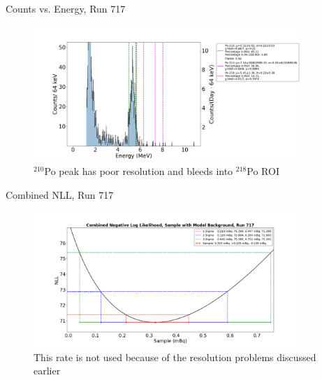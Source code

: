 \documentclass[aspectratio=169]{beamer}
\begin{document}
\begin{frame}{Counts vs. Energy, Run 717}
    \begin{figure}
        \begin{center}
            \includegraphics[width=0.9\textwidth]
            {assets/717/CvE.png}
            \caption{$^{210}$Po peak has poor resolution and bleeds into $^{218}$Po ROI}
        \end{center}
    \end{figure}
\end{frame}

\begin{frame}{Combined NLL, Run 717}
    \begin{figure}
        \begin{center}
            \includegraphics[width=0.9\textwidth]
            {assets/717/comNLL.png}
            \caption{This rate is not used because of the resolution problems discussed earlier}
        \end{center}
    \end{figure}
\end{frame}
\end{document}

